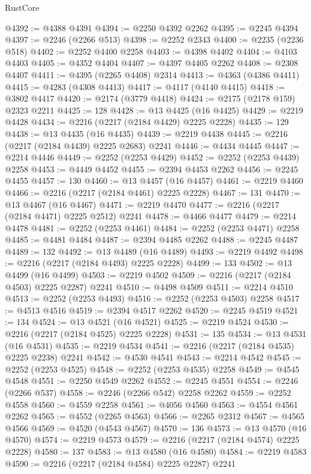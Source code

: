\begin{lexlean}{RustCore}
\begin{coremodule}
@4392 := @4388 @4391
@4394 := @2250 @4392 @2262
@4395 := @2245 @4394
@4397 := @2246 (@2266 @513)
@4398 := @2252 @2343
@4400 := @2235 (@2236 @518)
@4402 := @2252 @4400 @2258
@4403 := @4398 @4402
@4404 := @4103 @4403
@4405 := @4352 @4404
@4407 := @4397 @4405 @2262
@4408 := @2308 @4407
@4411 := @4395 (@2265 @4408) @2314
@4413 := @4363 (@4386 @4411)
@4415 := @4283 (@4308 @4413)
@4417 := @4117 (@4140 @4415)
@4418 := @3802 @4417
@4420 := @2174 (@3779 @4418)
@4424 := @2175 (@2178 @159) @2323 @2211
@4425 := 128
@4428 := @13 @4425 (@16 @4425)
@4429 := @2219 @4428
@4434 := @2216 (@2217 (@2184 @4429) @2225 @2228)
@4435 := 129
@4438 := @13 @4435 (@16 @4435)
@4439 := @2219 @4438
@4445 := @2216 (@2217 (@2184 @4439) @2225 @2683) @2241
@4446 := @4434 @4445
@4447 := @2214 @4446
@4449 := @2252 (@2253 @4429)
@4452 := @2252 (@2253 @4439) @2258
@4453 := @4449 @4452
@4455 := @2394 @4453 @2262
@4456 := @2245 @4455
@4457 := 130
@4460 := @13 @4457 (@16 @4457)
@4461 := @2219 @4460
@4466 := @2216 (@2217 (@2184 @4461) @2225 @2228)
@4467 := 131
@4470 := @13 @4467 (@16 @4467)
@4471 := @2219 @4470
@4477 := @2216 (@2217 (@2184 @4471) @2225 @2512) @2241
@4478 := @4466 @4477
@4479 := @2214 @4478
@4481 := @2252 (@2253 @4461)
@4484 := @2252 (@2253 @4471) @2258
@4485 := @4481 @4484
@4487 := @2394 @4485 @2262
@4488 := @2245 @4487
@4489 := 132
@4492 := @13 @4489 (@16 @4489)
@4493 := @2219 @4492
@4498 := @2216 (@2217 (@2184 @4493) @2225 @2228)
@4499 := 133
@4502 := @13 @4499 (@16 @4499)
@4503 := @2219 @4502
@4509 := @2216 (@2217 (@2184 @4503) @2225 @2287) @2241
@4510 := @4498 @4509
@4511 := @2214 @4510
@4513 := @2252 (@2253 @4493)
@4516 := @2252 (@2253 @4503) @2258
@4517 := @4513 @4516
@4519 := @2394 @4517 @2262
@4520 := @2245 @4519
@4521 := 134
@4524 := @13 @4521 (@16 @4521)
@4525 := @2219 @4524
@4530 := @2216 (@2217 (@2184 @4525) @2225 @2228)
@4531 := 135
@4534 := @13 @4531 (@16 @4531)
@4535 := @2219 @4534
@4541 := @2216 (@2217 (@2184 @4535) @2225 @2238) @2241
@4542 := @4530 @4541
@4543 := @2214 @4542
@4545 := @2252 (@2253 @4525)
@4548 := @2252 (@2253 @4535) @2258
@4549 := @4545 @4548
@4551 := @2250 @4549 @2262
@4552 := @2245 @4551
@4554 := @2246 (@2266 @537)
@4558 := @2246 (@2266 @542) @2258 @2262
@4559 := @2252 @4558
@4560 := @4559 @2258
@4561 := @4056 @4560
@4563 := @4554 @4561 @2262
@4565 := @4552 (@2265 @4563)
@4566 := @2265 @2312
@4567 := @4565 @4566
@4569 := @4520 (@4543 @4567)
@4570 := 136
@4573 := @13 @4570 (@16 @4570)
@4574 := @2219 @4573
@4579 := @2216 (@2217 (@2184 @4574) @2225 @2228)
@4580 := 137
@4583 := @13 @4580 (@16 @4580)
@4584 := @2219 @4583
@4590 := @2216 (@2217 (@2184 @4584) @2225 @2287) @2241

\end{coremodule}
\end{lexlean}
